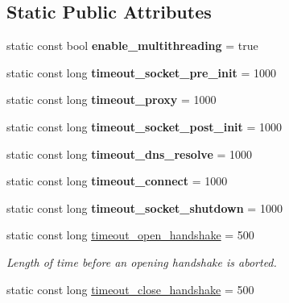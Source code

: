 \subsection*{Static Public Attributes}
\begin{DoxyCompactItemize}
\item 
static const bool {\bfseries enable\+\_\+multithreading} = true\hypertarget{classconfig_ad2ff809121a7a0c3ca9fa74190b6a683}{}\label{classconfig_ad2ff809121a7a0c3ca9fa74190b6a683}

\item 
static const long {\bfseries timeout\+\_\+socket\+\_\+pre\+\_\+init} = 1000\hypertarget{classconfig_ab70f11c91b7d43a9dbf4710df9d5b886}{}\label{classconfig_ab70f11c91b7d43a9dbf4710df9d5b886}

\item 
static const long {\bfseries timeout\+\_\+proxy} = 1000\hypertarget{classconfig_a8b5ede90c164880d9c509a06fbe74cb4}{}\label{classconfig_a8b5ede90c164880d9c509a06fbe74cb4}

\item 
static const long {\bfseries timeout\+\_\+socket\+\_\+post\+\_\+init} = 1000\hypertarget{classconfig_a32ac20993fbbaa83117d944c9ffb14a5}{}\label{classconfig_a32ac20993fbbaa83117d944c9ffb14a5}

\item 
static const long {\bfseries timeout\+\_\+dns\+\_\+resolve} = 1000\hypertarget{classconfig_aa38fcb59d8b21a938c35a87c6acb34fc}{}\label{classconfig_aa38fcb59d8b21a938c35a87c6acb34fc}

\item 
static const long {\bfseries timeout\+\_\+connect} = 1000\hypertarget{classconfig_a2b37e99733d9bdcb7782be8303fa9458}{}\label{classconfig_a2b37e99733d9bdcb7782be8303fa9458}

\item 
static const long {\bfseries timeout\+\_\+socket\+\_\+shutdown} = 1000\hypertarget{classconfig_a0e33b5245daabd6441db5cfd3cd32ccf}{}\label{classconfig_a0e33b5245daabd6441db5cfd3cd32ccf}

\item 
static const long \hyperlink{classconfig_a6e7bdfe35c4f5c21439e62a19f246aa3}{timeout\+\_\+open\+\_\+handshake} = 500\hypertarget{classconfig_a6e7bdfe35c4f5c21439e62a19f246aa3}{}\label{classconfig_a6e7bdfe35c4f5c21439e62a19f246aa3}

\begin{DoxyCompactList}\small\item\em Length of time before an opening handshake is aborted. \end{DoxyCompactList}\item 
static const long \hyperlink{classconfig_a72a7ba41094b21293a0fa92634501dfa}{timeout\+\_\+close\+\_\+handshake} = 500\hypertarget{classconfig_a72a7ba41094b21293a0fa92634501dfa}{}\label{classconfig_a72a7ba41094b21293a0fa92634501dfa}


\end{DoxyCompactItemize}
